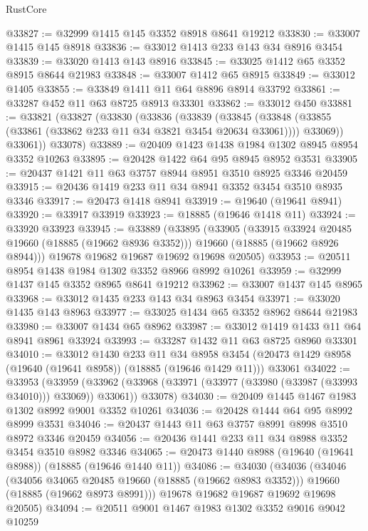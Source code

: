 \begin{lexlean}{RustCore}
\begin{coremodule}
@33827 := @32999 @1415 @145 @3352 @8918 @8641 @19212
@33830 := @33007 @1415 @145 @8918
@33836 := @33012 @1413 @233 @143 @34 @8916 @3454
@33839 := @33020 @1413 @143 @8916
@33845 := @33025 @1412 @65 @3352 @8915 @8644 @21983
@33848 := @33007 @1412 @65 @8915
@33849 := @33012 @1405
@33855 := @33849 @1411 @11 @64 @8896 @8914 @33792
@33861 := @33287 @452 @11 @63 @8725 @8913 @33301
@33862 := @33012 @450
@33881 := @33821
    (@33827
      (@33830
        (@33836
          (@33839
            (@33845
              (@33848 (@33855 (@33861 (@33862 @233 @11 @34 @3821 @3454 @20634 @33061))))
              @33069))
          @33061))
      @33078)
@33889 := @20409 @1423 @1438 @1984 @1302 @8945 @8954 @3352 @10263
@33895 := @20428 @1422 @64 @95 @8945 @8952 @3531
@33905 := @20437 @1421 @11 @63 @3757 @8944 @8951 @3510 @8925 @3346 @20459
@33915 := @20436 @1419 @233 @11 @34 @8941 @3352 @3454 @3510 @8935 @3346
@33917 := @20473 @1418 @8941
@33919 := @19640 (@19641 @8941)
@33920 := @33917 @33919
@33923 := @18885 (@19646 @1418 @11)
@33924 := @33920 @33923
@33945 := @33889
    (@33895
      (@33905
        (@33915 @33924 @20485 @19660 (@18885 (@19662 @8936 @3352)))
        @19660
        (@18885 (@19662 @8926 @8944)))
      @19678
      @19682
      @19687
      @19692
      @19698
      @20505)
@33953 := @20511 @8954 @1438 @1984 @1302 @3352 @8966 @8992 @10261
@33959 := @32999 @1437 @145 @3352 @8965 @8641 @19212
@33962 := @33007 @1437 @145 @8965
@33968 := @33012 @1435 @233 @143 @34 @8963 @3454
@33971 := @33020 @1435 @143 @8963
@33977 := @33025 @1434 @65 @3352 @8962 @8644 @21983
@33980 := @33007 @1434 @65 @8962
@33987 := @33012 @1419 @1433 @11 @64 @8941 @8961 @33924
@33993 := @33287 @1432 @11 @63 @8725 @8960 @33301
@34010 := @33012
    @1430
    @233
    @11
    @34
    @8958
    @3454
    (@20473 @1429 @8958 (@19640 (@19641 @8958)) (@18885 (@19646 @1429 @11)))
    @33061
@34022 := @33953
    (@33959
      (@33962 (@33968 (@33971 (@33977 (@33980 (@33987 (@33993 @34010))) @33069)) @33061))
      @33078)
@34030 := @20409 @1445 @1467 @1983 @1302 @8992 @9001 @3352 @10261
@34036 := @20428 @1444 @64 @95 @8992 @8999 @3531
@34046 := @20437 @1443 @11 @63 @3757 @8991 @8998 @3510 @8972 @3346 @20459
@34056 := @20436 @1441 @233 @11 @34 @8988 @3352 @3454 @3510 @8982 @3346
@34065 := @20473 @1440 @8988 (@19640 (@19641 @8988)) (@18885 (@19646 @1440 @11))
@34086 := @34030
    (@34036
      (@34046
        (@34056 @34065 @20485 @19660 (@18885 (@19662 @8983 @3352)))
        @19660
        (@18885 (@19662 @8973 @8991)))
      @19678
      @19682
      @19687
      @19692
      @19698
      @20505)
@34094 := @20511 @9001 @1467 @1983 @1302 @3352 @9016 @9042 @10259

\end{coremodule}
\end{lexlean}
